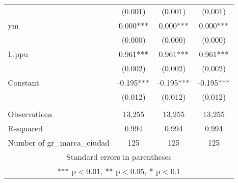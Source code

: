 \begin{tabular}{lccc}
 & (0.001) & (0.001) & (0.001) \\
ym & 0.000*** & 0.000*** & 0.000*** \\
 & (0.000) & (0.000) & (0.000) \\
L.ppu & 0.961*** & 0.961*** & 0.961*** \\
 & (0.002) & (0.002) & (0.002) \\
Constant & -0.195*** & -0.195*** & -0.195*** \\
 & (0.012) & (0.012) & (0.012) \\
 &  &  &  \\
Observations & 13,255 & 13,255 & 13,255 \\
R-squared & 0.994 & 0.994 & 0.994 \\
 Number of gr\_marca\_ciudad & 125 & 125 & 125 \\ \hline
\multicolumn{4}{c}{ Standard errors in parentheses} \\
\multicolumn{4}{c}{ *** p$<$0.01, ** p$<$0.05, * p$<$0.1} \\
\end{tabular}
